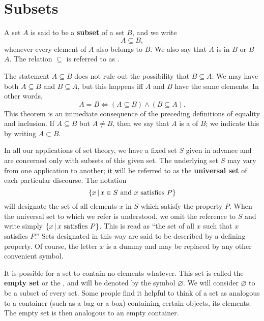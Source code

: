 \section{Subsets}\label{sec:1.2.3}

\begin{defn}\label{defn:1.2.4}
  A set \(A\) is said to be a \textbf{subset} of a set \(B\), and we write
  \[
    A \subseteq B,
  \]
  whenever every element of \(A\) also belongs to \(B\).
  We also say that \(A\) is \textbf{} in \(B\) or \(B\) \textbf{} \(A\).
  The relation \(\subseteq\) is referred to as \textbf{}.

  The statement \(A \subseteq B\) does not rule out the possibility that \(B \subseteq A\).
  We may have both \(A \subseteq B\) and \(B \subseteq A\), but this happens iff \(A\) and \(B\) have the same elements.
  In other words,
  \[
    A = B \iff (A \subseteq B) \land (B \subseteq A).
  \]
  This theorem is an immediate consequence of the preceding definitions of equality and inclusion.
  If \(A \subseteq B\) but \(A \neq B\), then we say that \(A\) is a \textbf{} of \(B\);
  we indicate this by writing \(A \subset B\).
\end{defn}

\begin{defn}\label{defn:1.2.5}
  In all our applications of set theory, we have a fixed set \(S\) given in advance and are concerned only with subsets of this given set.
  The underlying set \(S\) may vary from one application to another;
  it will be referred to as the \textbf{universal set} of each particular discourse.
  The notation
  \[
    \left\lbrace x \,\middle|\, x \in S \text{ and } x \text{ satisfies } P\right\rbrace
  \]
  will designate the set of all elements \(x\) in \(S\) which satisfy the property \(P\).
  When the universal set to which we refer is understood, we omit the reference to \(S\) and write simply \(\left\lbrace x \,\middle|\, x \text{ satisfies } P\right\rbrace\).
  This is read as ``the set of all \(x\) such that \(x\) satisfies \(P\).''
  Sets designated in this way are said to be described by a defining property.
  Of course, the letter \(x\) is a dummy and may be replaced by any other convenient symbol.
\end{defn}

\begin{defn}\label{defn:1.2.6}
  It is possible for a set to contain no elements whatever.
  This set is called the \textbf{empty set} or the \textbf{}, and will be denoted by the symbol \(\varnothing\).
  We will consider \(\varnothing\) to be a subset of every set.
  Some people find it helpful to think of a set as analogous to a container (such as a bag or a box) containing certain objects, its elements.
  The empty set is then analogous to an empty container.
\end{defn}

